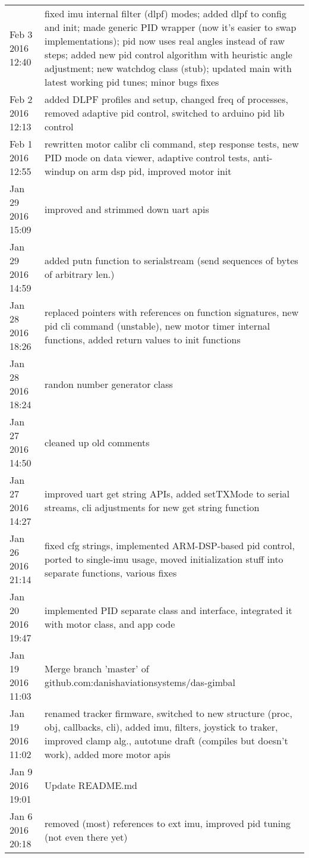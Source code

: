\begin{tabular}{ l || p{12cm} }
	Feb 3 2016 12:40	& fixed imu internal filter (dlpf) modes; added dlpf to config and init; made generic PID wrapper (now it's easier to swap implementations); pid now uses real angles instead of raw steps; added new pid control algorithm with heuristic angle adjustment; new watchdog class (stub); updated main with latest working pid tunes; minor bugs fixes	\\
	Feb 2 2016 12:13	& added DLPF profiles and setup, changed freq of processes, removed adaptive pid control, switched to arduino pid lib control	\\
	Feb 1 2016 12:55	& rewritten motor calibr cli command, step response tests, new PID mode on data viewer, adaptive control tests, anti-windup on arm dsp pid, improved motor init	\\
	Jan 29 2016 15:09	& improved and strimmed down uart apis	\\
	Jan 29 2016 14:59	& added putn function to serialstream (send sequences of bytes of arbitrary len.)	\\
	Jan 28 2016 18:26	& replaced pointers with references on function signatures, new pid cli command (unstable), new motor timer internal functions, added return values to init functions	\\
	Jan 28 2016 18:24	& randon number generator class	\\
	Jan 27 2016 14:50	& cleaned up old comments	\\
	Jan 27 2016 14:27	& improved uart get string APIs, added setTXMode to serial streams, cli adjustments for new get string function	\\
	Jan 26 2016 21:14	& fixed cfg strings, implemented ARM-DSP-based pid control, ported to single-imu usage, moved initialization stuff into separate functions, various fixes	\\
	Jan 20 2016 19:47	& implemented PID separate class and interface, integrated it with motor class, and app code	\\
	Jan 19 2016 11:03	& Merge branch 'master' of github.com:danishaviationsystems/das-gimbal	\\
	Jan 19 2016 11:02	& renamed tracker firmware, switched to new structure (proc, obj, callbacks, cli), added imu, filters, joystick to traker, improved clamp alg., autotune draft (compiles but doesn't work), added more motor apis	\\
	Jan 9 2016 19:01	& Update README.md	\\
	Jan 6 2016 20:18	& removed (most) references to ext imu, improved pid tuning (not even there yet)	\\

\end{tabular}
